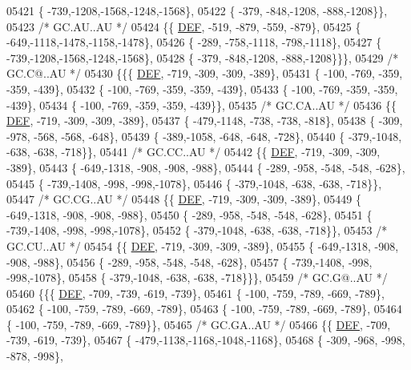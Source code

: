 \begin{DoxyCode}
05421 \{ -739,-1208,-1568,-1248,-1568\},
05422 \{ -379, -848,-1208, -888,-1208\}\},
05423 \textcolor{comment}{/* GC.AU..AU */}
05424 \{\{  \mbox{\hyperlink{1_88_84__epars_8h_a397419fc12b37ed479c8abb9d444d843}{DEF}}, -519, -879, -559, -879\},
05425 \{ -649,-1118,-1478,-1158,-1478\},
05426 \{ -289, -758,-1118, -798,-1118\},
05427 \{ -739,-1208,-1568,-1248,-1568\},
05428 \{ -379, -848,-1208, -888,-1208\}\}\},
05429 \textcolor{comment}{/* GC.C@..AU */}
05430 \{\{\{  \mbox{\hyperlink{1_88_84__epars_8h_a397419fc12b37ed479c8abb9d444d843}{DEF}}, -719, -309, -309, -389\},
05431 \{ -100, -769, -359, -359, -439\},
05432 \{ -100, -769, -359, -359, -439\},
05433 \{ -100, -769, -359, -359, -439\},
05434 \{ -100, -769, -359, -359, -439\}\},
05435 \textcolor{comment}{/* GC.CA..AU */}
05436 \{\{  \mbox{\hyperlink{1_88_84__epars_8h_a397419fc12b37ed479c8abb9d444d843}{DEF}}, -719, -309, -309, -389\},
05437 \{ -479,-1148, -738, -738, -818\},
05438 \{ -309, -978, -568, -568, -648\},
05439 \{ -389,-1058, -648, -648, -728\},
05440 \{ -379,-1048, -638, -638, -718\}\},
05441 \textcolor{comment}{/* GC.CC..AU */}
05442 \{\{  \mbox{\hyperlink{1_88_84__epars_8h_a397419fc12b37ed479c8abb9d444d843}{DEF}}, -719, -309, -309, -389\},
05443 \{ -649,-1318, -908, -908, -988\},
05444 \{ -289, -958, -548, -548, -628\},
05445 \{ -739,-1408, -998, -998,-1078\},
05446 \{ -379,-1048, -638, -638, -718\}\},
05447 \textcolor{comment}{/* GC.CG..AU */}
05448 \{\{  \mbox{\hyperlink{1_88_84__epars_8h_a397419fc12b37ed479c8abb9d444d843}{DEF}}, -719, -309, -309, -389\},
05449 \{ -649,-1318, -908, -908, -988\},
05450 \{ -289, -958, -548, -548, -628\},
05451 \{ -739,-1408, -998, -998,-1078\},
05452 \{ -379,-1048, -638, -638, -718\}\},
05453 \textcolor{comment}{/* GC.CU..AU */}
05454 \{\{  \mbox{\hyperlink{1_88_84__epars_8h_a397419fc12b37ed479c8abb9d444d843}{DEF}}, -719, -309, -309, -389\},
05455 \{ -649,-1318, -908, -908, -988\},
05456 \{ -289, -958, -548, -548, -628\},
05457 \{ -739,-1408, -998, -998,-1078\},
05458 \{ -379,-1048, -638, -638, -718\}\}\},
05459 \textcolor{comment}{/* GC.G@..AU */}
05460 \{\{\{  \mbox{\hyperlink{1_88_84__epars_8h_a397419fc12b37ed479c8abb9d444d843}{DEF}}, -709, -739, -619, -739\},
05461 \{ -100, -759, -789, -669, -789\},
05462 \{ -100, -759, -789, -669, -789\},
05463 \{ -100, -759, -789, -669, -789\},
05464 \{ -100, -759, -789, -669, -789\}\},
05465 \textcolor{comment}{/* GC.GA..AU */}
05466 \{\{  \mbox{\hyperlink{1_88_84__epars_8h_a397419fc12b37ed479c8abb9d444d843}{DEF}}, -709, -739, -619, -739\},
05467 \{ -479,-1138,-1168,-1048,-1168\},
05468 \{ -309, -968, -998, -878, -998\},

\end{DoxyCode}
